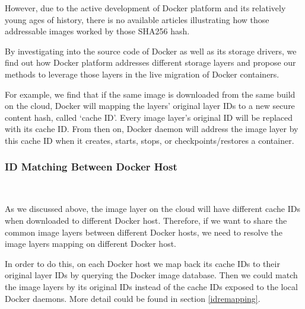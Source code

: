 However, due to the active development of Docker platform and its relatively young ages of history, there is no available articles illustrating how those addressable images worked by those SHA256 hash. 

By investigating into the source code of Docker as well as its storage drivers, we find out how Docker platform addresses different storage layers and propose our methods to leverage those layers in the live migration of Docker containers.

For example, we find that 
if the same image is downloaded from the same build on the cloud, Docker will mapping the layers' original layer IDs to a new secure content hash, called `cache ID'. Every image layer's original ID will be replaced with its cache ID. From then on, Docker daemon will address the image layer by this cache ID when it creates, starts, stops, or checkpoints/restores a container. 


\smallbreak
\subsubsection{ID Matching Between Docker Host} \label{intro:idMatching}
~\smallbreak

As we discussed above, 
the image layer on the cloud will have different cache IDs when downloaded to different Docker host. 
Therefore, if we want to share the common image layers between different Docker hosts, we need to resolve the image layers mapping on different Docker host. 

In order to do this, on each Docker host we map back its cache IDs to their original layer IDs by querying the Docker image database. 
Then we could match the image layers by its original IDs instead of the cache IDs exposed to the local Docker daemons. More detail could be found in section \ref{idremapping}.




